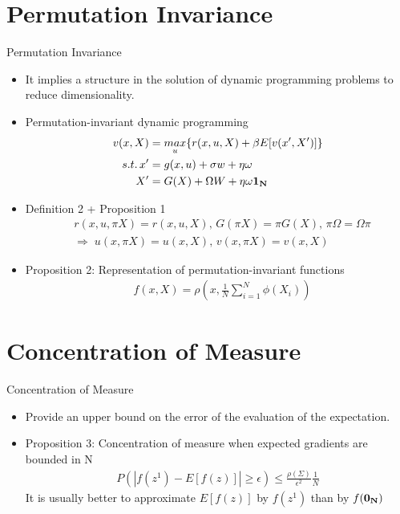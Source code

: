 \documentclass[dvipsnames,mathserif]{beamer}
\begin{document}
{\section{Permutation Invariance}
\begin{frame}{Permutation Invariance}
    \begin{itemize}
        \item It implies a structure in the solution of dynamic programming problems to reduce dimensionality.\\
        \vspace{0.2cm}
        \item Permutation-invariant dynamic programming\\
        \begin{align*}
        v(x,X) &= \underset{u}{max}\{r(x,u,X) + \beta E[v(x',X')]\}\\
        s.t.\, x' &= g(x,u) + \sigma w + \eta \omega\\
        X'&= G(X) + \Omega W + \eta\omega\bf{1}_{N}
        \end{align*}
        \item Definition 2 + Proposition 1
        \begin{align*}
        &r(x,u,\pi X) = r(x,u,X),\,G(\pi X) = \pi G(X),\,\pi \Omega = \Omega \pi \\
        &\Rightarrow \; u(x,\pi X) = u(x,X),\,v(x,\pi X) = v(x,X)
        \end{align*}
        \item Proposition 2: Representation of permutation-invariant functions
        \begin{align*}
        &f(x,X) = \rho(x,\frac{1}{N}\sum_{i=1}^{N}\phi(X_i))
        \end{align*}
    \end{itemize}
\end{frame}


\section{Concentration of Measure}
\begin{frame}{Concentration of Measure}
    \begin{itemize}
        \item Provide an upper bound on the error of the evaluation of the expectation.\\ 
        \vspace{0.1cm}
        \item Proposition 3: Concentration of measure when expected gradients are bounded in N
        \begin{align*}
        P(|f(z^1) - E[f(z)]| \geq \epsilon) \leq \frac{\rho(\Sigma)}{\epsilon^2}\frac{1}{N}
        \end{align*}
        It is usually better to approximate $E [f (z)]$ by $f (z^1)$ than by $f(\bf{0}_N)$
        \vspace{0.2cm}
    \end{itemize}
\end{frame}

}
\end{document}
